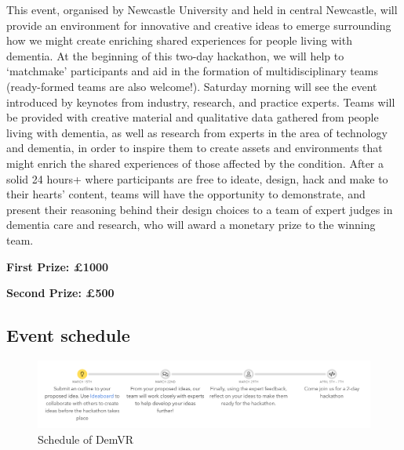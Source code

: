This event, organised by Newcastle University and held in central Newcastle, will provide an environment for innovative and creative ideas to emerge surrounding how we might create enriching shared experiences for people living with dementia. At the beginning of this two-day hackathon, we will help to `matchmake' participants and aid in the formation of multidisciplinary teams (ready-formed teams are also welcome!). Saturday morning will see the event introduced by keynotes from industry, research, and practice experts. Teams will be provided with creative material and qualitative data gathered from people living with dementia, as well as research from experts in the area of technology and dementia, in order to inspire them to create assets and environments that might enrich the shared experiences of those affected by the condition. After a solid 24 hours+ where participants are free to ideate, design, hack and make to their hearts' content, teams will have the opportunity to demonstrate, and present their reasoning behind their design choices to a team of expert judges in dementia care and research, who will award a monetary prize to the winning team.   

\textbf{First Prize: £1000}

\textbf{Second Prize: £500}



\subsection{Event schedule}
\label{app:DemVR:EventSchedule}
\begin{figure}[htp]
    \centering
    \includegraphics[width=0.8\linewidth]{Images/Appendix/DemVR appendix/Schedule.png}
    \caption{Schedule of DemVR}
    \label{fig:App:DemVRSchedule}
\end{figure}

